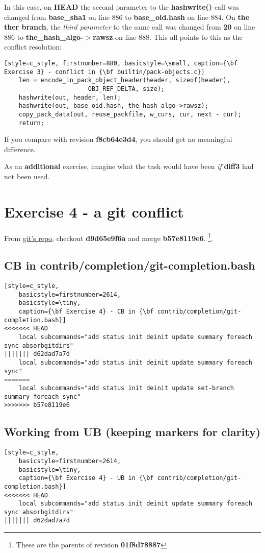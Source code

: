 In this case, on {\bf HEAD} the second parameter to the {\bf hashwrite()} call was changed from {\bf base\_sha1} on
line 886 to {\bf base\_oid.hash} on line 884. On {\bf the ther branch}, the {\it third parameter} to the same call was
changed from {\bf 20} on line 886 to {\bf the\_hash\_algo-$>$rawsz} on line 888. This all points to this as the conflict
resolution:

\begin{lstlisting}[style=c_style, firstnumber=880, basicstyle=\small, caption={\bf Exercise 3} - conflict in {\bf builtin/pack-objects.c}]
	len = encode_in_pack_object_header(header, sizeof(header),
					   OBJ_REF_DELTA, size);
	hashwrite(out, header, len);
	hashwrite(out, base_oid.hash, the_hash_algo->rawsz);
	copy_pack_data(out, reuse_packfile, w_curs, cur, next - cur);
	return;
\end{lstlisting}

If you compare with revision {\bf f8cb64e3d4}, you should get no meaningful difference.

As an {\bf additional} exercise, imagine what the task would have been {\it if} {\bf diff3} had not been used.

\section{Exercise 4 - a git conflict}
\label{exercise_04}
From \hyperref[git_repo]{git's repo}, checkout {\bf d9d65e9f6a} and merge {\bf b57e8119e6}.
\footnote{These are the parents of revision {\bf 01f8d78887}}.

\subsection*{CB in contrib/completion/git-completion.bash}
\begin{lstlisting}[style=c_style,
	basicstyle=firstnumber=2614,
	basicstyle=\tiny,
	caption={\bf Exercise 4} - CB in {\bf contrib/completion/git-completion.bash}]
<<<<<<< HEAD
	local subcommands="add status init deinit update summary foreach sync absorbgitdirs"
||||||| d62dad7a7d
	local subcommands="add status init deinit update summary foreach sync"
=======
	local subcommands="add status init deinit update set-branch summary foreach sync"
>>>>>>> b57e8119e6
\end{lstlisting}

\subsection*{Working from {\bf UB} (keeping markers for clarity)}
\begin{lstlisting}[style=c_style,
	basicstyle=firstnumber=2614,
	basicstyle=\tiny,
	caption={\bf Exercise 4} - UB in {\bf contrib/completion/git-completion.bash}]
<<<<<<< HEAD
	local subcommands="add status init deinit update summary foreach sync absorbgitdirs"
||||||| d62dad7a7d
\end{lstlisting}

